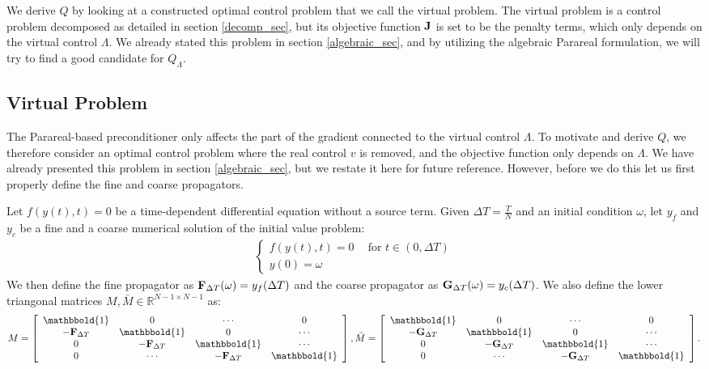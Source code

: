 \\
\\
We derive $Q$ by looking at a constructed optimal control problem that we call the virtual problem. The virtual problem is a control problem decomposed as detailed in section \ref{decomp_sec}, but its objective function $\bold J$ is set to be the penalty terms, which only depends on the virtual control $\Lambda$. We already stated this problem in section \ref{algebraic_sec}, and by utilizing the algebraic Parareal formulation, we will try to find a good candidate for $Q_{\Lambda}$.
\subsection{Virtual Problem} \label{vir_sec}
The Parareal-based preconditioner only affects the part of the gradient connected to the virtual control $\Lambda$. To motivate and derive $Q$, we therefore consider an optimal control problem where the real control $v$ is removed, and the objective function only depends on $\Lambda$. We have already presented this problem in section \ref{algebraic_sec}, but we restate it here for future reference. However, before we do this let us first properly define the fine and coarse propagators.
\begin{definition} \label{prop_def}
Let $f(y(t),t)=0$ be a time-dependent differential equation without a source term. Given $\Delta T=\frac{T}{N}$ and an initial condition $\omega$, let $y_f$ and $y_c$ be a fine and a coarse numerical solution of the initial value problem:
\begin{align}
 \left\{
     \begin{array}{lr}
		f(y(t),t)=0 \ \quad \textrm{for $t \in (0,\Delta T)$} \\
		y(0)=\omega
	\end{array}
	\right.	
\end{align}
We then define the fine propagator as $\bold F_{\Delta T}(\omega) = y_f(\Delta T)$ and the coarse propagator as $\bold G_{\Delta T}(\omega) = y_c(\Delta T)$. We also define the lower triangonal matrices $M,\bar M\in\mathbb{R}^{N-1\times N-1}$ as: 
\begin{align*}
M= \left[ \begin{array}{cccc}
   \mathbbold{1} & 0 & \cdots & 0 \\  
   -\bold{F}_{\Delta T} & \mathbbold{1} & 0 & \cdots \\ 
   0 &-\bold{F}_{\Delta T} & \mathbbold{1}  & \cdots \\
   0 &\cdots &-\bold{F}_{\Delta T} & \mathbbold{1}  \\
   \end{array}  \right],
\bar M= \left[ \begin{array}{cccc}
   \mathbbold{1} & 0 & \cdots & 0 \\  
   -\bold{G}_{\Delta T} & \mathbbold{1} & 0 & \cdots \\ 
   0 &-\bold{G}_{\Delta T} & \mathbbold{1}  & \cdots \\
   0 &\cdots &-\bold{G}_{\Delta T} & \mathbbold{1}   \\
   \end{array}  \right].
\end{align*}
\end{definition}
